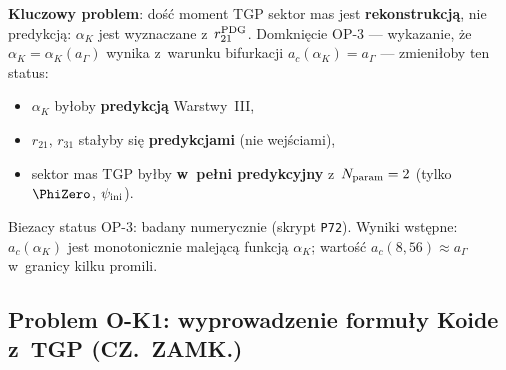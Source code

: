 \begin{remark}%
\label{rem:OP3-koide}
\textbf{Kluczowy problem}: do\'s\'c moment TGP sektor mas jest
\textbf{rekonstrukcj\k{a}}, nie predykcj\k{a}:
$\alpha_K$ jest wyznaczane z~$r_{21}^{\rm PDG}$.
Domkni\k{e}cie OP-3 --- wykazanie,
\.ze $\alpha_K = \alpha_K(a_\Gamma)$ wynika z~warunku
bifurkacji $a_c(\alpha_K) = a_\Gamma$ --- zmieni\l{}oby ten status:
\begin{itemize}[nosep]
  \item $\alpha_K$ by\l{}oby \textbf{predykcj\k{a}} Warstwy~III,
  \item $r_{21}$, $r_{31}$ sta\l{}yby si\k{e} \textbf{predykcjami} (nie wej\'sciami),
  \item sektor mas TGP by\l{}by \textbf{w~pe\l{}ni predykcyjny}
    z~$N_{\rm param} = 2$ (tylko $\PhiZero$, $\psi_{\rm ini}$).
\end{itemize}
Biezacy status OP-3: badany numerycznie (skrypt \texttt{P72}).
Wyniki wst\k{e}pne: $a_c(\alpha_K)$ jest monotonicznie malej\k{a}c\k{a}
funkcj\k{a} $\alpha_K$; warto\'s\'c $a_c(8{,}56) \approx a_\Gamma$ w~granicy
kilku promili.
\end{remark}

\subsection{Problem O-K1: wyprowadzenie formu\l{}y Koide z~TGP (CZ.~ZAMK.)}%
\label{app:F-koide-open}


